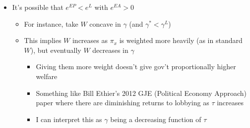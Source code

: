 \documentclass[12pt]{article}
\newcommand{\ga}{\gamma}
\begin{document}
\begin{itemize}
		
	 \item It's possible that $e^{EP} < e^{L}$ with $e^{EA} > 0$
		\begin{itemize}
			\item For instance, take $W$ concave in $\ga$ (and $\ga^* < \ga^L$)
			\item This implies $W$ increases as $\pi_x$ is weighted more heavily (as in standard $W$), but eventually $W$ decreases in $\ga$
				\begin{itemize}
					\item Giving them more weight doesn't give gov't proportionally higher welfare
					\item Something like Bill Ethier's 2012 GJE (Political Economy Approach) paper where there are diminishing returns to lobbying as $\tau$ increases
					\item I can interpret this as $\ga$ being a decreasing function of $\tau$
				\end{itemize}
		\end{itemize}
\end{itemize}
\end{document}
